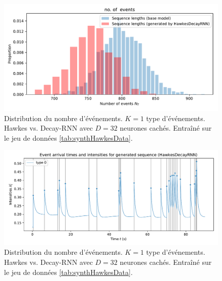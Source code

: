 \documentclass[../main.tex]{subfiles}
\begin{document}
\begin{figure}[htp]
	\includegraphics[width=\linewidth]{../results/seq_length_distrib_HawkesDecayRNN-1d-hidden_32-20181205-143543.pdf}
	\caption{Distribution du nombre d'événements. $K=1$ type d'événements. Hawkes vs. Decay-RNN avec $D=32$ neurones cachés. Entraîné sur le jeu de données \autoref{tab:synthHawkesData}.}\label{fig:1DRNNlengthDistrib}
\end{figure}

\begin{figure}[htp]
	\includegraphics[width=\linewidth]{../results/intensity_HawkesDecayRNN_1d_hidden32_20181205-230630.pdf}
	\caption{Distribution du nombre d'événements. $K=1$ type d'événements. Hawkes vs. Decay-RNN avec $D=32$ neurones cachés. Entraîné sur le jeu de données \autoref{tab:synthHawkesData}.}\label{fig:1DRNNintensityPlot}
\end{figure}
\end{document}
